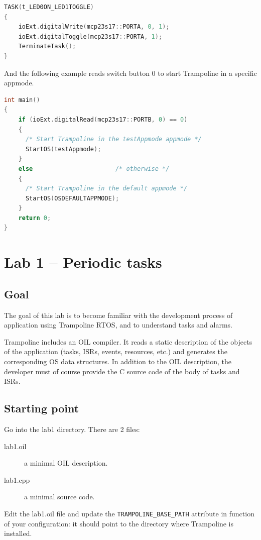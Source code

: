 \documentclass[11pt]{report}
\begin{document}
\begin{lstlisting}[language=C]
TASK(t_LED0ON_LED1TOGGLE)
{
    ioExt.digitalWrite(mcp23s17::PORTA, 0, 1);
    ioExt.digitalToggle(mcp23s17::PORTA, 1);
    TerminateTask();
}
\end{lstlisting}


And the following example reads switch button {0} to start Trampoline in a specific appmode.

\begin{lstlisting}[language=C]
int main()
{
    if (ioExt.digitalRead(mcp23s17::PORTB, 0) == 0)
    {
      /* Start Trampoline in the testAppmode appmode */
      StartOS(testAppmode);
    }
    else                       /* otherwise */
    {
      /* Start Trampoline in the default appmode */
      StartOS(OSDEFAULTAPPMODE);
    }
    return 0;
}
\end{lstlisting}


\chapter{Lab 1 -- Periodic tasks}

\section{Goal}

The goal of this lab is to become familiar with the development
process of application using Trampoline RTOS, and to understand tasks and alarms.

Trampoline includes an OIL compiler.
It reads a static description of the objects of the application (tasks,
ISRs, events, resources, etc.) and generates the corresponding OS data structures.
In addition to the OIL description, the developer must of course provide the C
source code of the body of tasks and ISRs.


\section{Starting point}

Go into the lab1 directory. There are 2 files:

\begin{description}
    \item[lab1.oil] a minimal OIL description.
    \item[lab1.cpp] a minimal source code.
\end{description}

Edit the lab1.oil file and update the \texttt{TRAMPOLINE\_BASE\_PATH} attribute
in function of your configuration: it should point to the directory where Trampoline is installed.
\end{document}
